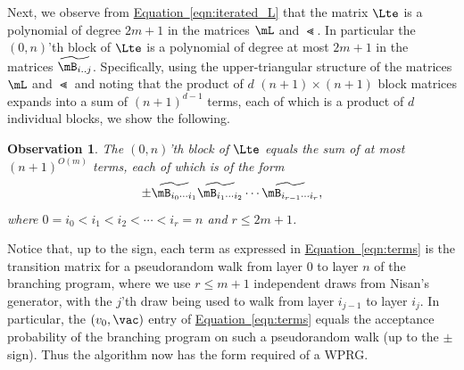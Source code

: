 \documentclass[11pt]{article}
\newcommand{\expeqref}[2]{\texorpdfstring{\hyperref[#2]{#1~\eqref{#2}}}{#1~\eqref{#2}}}
\newtheorem{observation}[theorem]{Observation}
\begin{document}
    Next, we observe from \expeqref{Equation}{eqn:iterated_L} that the matrix $\Lte$ is a polynomial of degree $2m+1$ in the matrices $\mL$ and $\Lt$.  In particular the $(0,n)$'th block of $\Lte$ is a polynomial of degree at most $2m+1$ in the matrices $\widetilde{\mB_{i .. j}}$.  Specifically, using the upper-triangular structure of the matrices $\mL$ and $\Lt$ and noting that the product of $d$ $(n+1)\times (n+1)$ block matrices expands into a sum of $(n+1)^{d-1}$ terms, each of which is a product of $d$ individual blocks, we show the following. %
    
    \begin{observation} \label{obs:path}
    The $(0,n)$'th block of $\Lte$ equals the sum of at most $(n+1)^{O(m)}$ terms, each of which is of the form 
    \begin{equation} \label{eqn:terms}
    \pm \widetilde{\mB_{i_0\cdots i_1}}
    \widetilde{\mB_{i_1\cdots i_2}}
    \cdots
    \widetilde{\mB_{i_{r-1}\cdots i_r}},
    \end{equation}
    where $0=i_0<i_1<i_2<\cdots<i_r=n$ and $r\leq 2m+1$.
    \end{observation}
    
    Notice that, up to the sign, each term as expressed in \expeqref{Equation}{eqn:terms} is the transition matrix for a pseudorandom walk from layer 0 to layer $n$ of the branching program, where we use $r\leq m+1$ independent draws from Nisan's generator, with the $j$'th draw being used to walk from layer $i_{j-1}$ to layer $i_j$.  In particular,
    the $(v_0,\vac)$ entry of \expeqref{Equation}{eqn:terms} equals the acceptance probability of the branching program on such a pseudorandom walk (up to the $\pm$ sign).
    Thus the algorithm now has the form required of a WPRG. 
    
\end{document}
